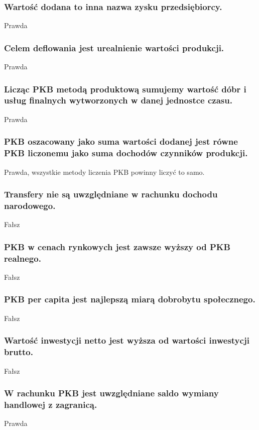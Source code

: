 \documentclass[a4paper,12pt]{article}
\begin{document}
\subsubsection{Wartość dodana to inna nazwa zysku przedsiębiorcy.}
Prawda

\subsubsection{Celem deflowania jest urealnienie wartości produkcji.}
Prawda

\subsubsection{Licząc PKB metodą produktową sumujemy wartość dóbr i usług finalnych wytworzonych w danej jednostce czasu.}

Prawda

\subsubsection{PKB oszacowany jako suma wartości dodanej jest równe PKB liczonemu jako suma dochodów czynników produkcji.}
Prawda, wszystkie metody liczenia PKB powinny liczyć to samo.

\subsubsection{Transfery nie są uwzględniane w rachunku dochodu narodowego.}
Fałsz

\subsubsection{PKB w cenach rynkowych jest zawsze wyższy od PKB realnego.}
Fałsz

\subsubsection{PKB per capita jest najlepszą miarą dobrobytu społecznego.}

Fałsz

\subsubsection{Wartość inwestycji netto jest wyższa od wartości inwestycji brutto.}
Fałsz

\subsubsection{W rachunku PKB jest uwzględniane saldo wymiany handlowej z zagranicą.}
Prawda
\end{document}
